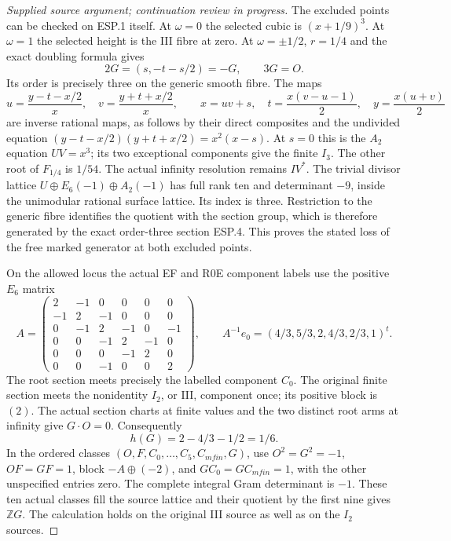 \begin{proof}[Supplied source argument; continuation review in progress]
The excluded points can be checked on ESP.1 itself. At \(\omega=0\)
the selected cubic is \((x+1/9)^3\). At \(\omega=1\) the selected
height is the III fibre at zero. At \(\omega=\pm1/2\), \(r=1/4\)
and the exact doubling formula gives
\[
                   2G=(s,-t-s/2)=-G,
                   \qquad 3G=O.
 \tag{ESP.4}
\]
Its order is precisely three on the generic smooth fibre. The maps
\[
 u=\frac{y-t-x/2}{x},\quad v=\frac{y+t+x/2}{x},
 \qquad x=uv+s,\quad t=\frac{x(v-u-1)}2,
 \quad y=\frac{x(u+v)}2
 \tag{ESP.5}
\]
are inverse rational maps, as follows by their direct composites and
the undivided equation
\((y-t-x/2)(y+t+x/2)=x^2(x-s)\). At \(s=0\) this is the
\(A_2\) equation \(UV=x^3\); its two exceptional components give
the finite \(I_3\). The other root of \(F_{1/4}\) is \(1/54\).
The actual infinity resolution remains \(IV^*\). The trivial
divisor lattice \(U\oplus E_6(-1)\oplus A_2(-1)\) has full
rank ten and determinant \(-9\), inside the unimodular rational
surface lattice. Its index is three. Restriction to the generic fibre
identifies the quotient with the section group, which is therefore
generated by the exact order-three section ESP.4. This proves the
stated loss of the free marked generator at both excluded points.

On the allowed locus the actual EF and R0E component labels use the
positive \(E_6\) matrix
\[
 A=\begin{pmatrix}
 2&-1&0&0&0&0\\-1&2&-1&0&0&0\\
 0&-1&2&-1&0&-1\\0&0&-1&2&-1&0\\
 0&0&0&-1&2&0\\0&0&-1&0&0&2
 \end{pmatrix},\qquad
 A^{-1}e_0=(4/3,5/3,2,4/3,2/3,1)^t.
 \tag{ESP.6}
\]
The root section meets precisely the labelled component \(C_0\).
The original finite section meets the nonidentity \(I_2\), or III,
component once; its positive block is \((2)\). The actual section
charts at finite values and the two distinct root arms at infinity
give \(G\cdot O=0\). Consequently
\[
                          h(G)=2-4/3-1/2=1/6.
 \tag{ESP.7}
\]
In the ordered classes \((O,F,C_0,\ldots,C_5,C_{
m fin},G)\),
use \(O^2=G^2=-1\), \(OF=GF=1\), block
\(-A\oplus(-2)\), and \(GC_0=GC_{
m fin}=1\), with the other
unspecified entries zero. The complete integral Gram determinant is
\(-1\). These ten actual classes fill the source lattice and their
quotient by the first nine gives \(\mathbb ZG\). The calculation
holds on the original III source as well as on the \(I_2\) sources.


\end{proof}
